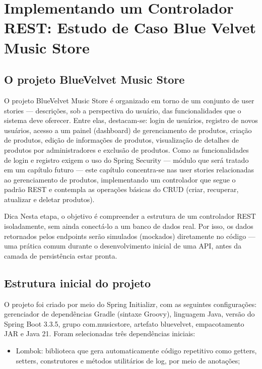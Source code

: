 \chapter{Implementando um Controlador REST: Estudo de Caso Blue Velvet Music Store}

\section{O projeto BlueVelvet Music Store}

O projeto BlueVelvet Music Store é organizado em torno de um conjunto de user stories — descrições, sob a perspectiva do usuário, das funcionalidades que o sistema deve oferecer. Entre elas, destacam-se: login de usuários, registro de novos usuários, acesso a um painel (dashboard) de gerenciamento de produtos, criação de produtos, edição de informações de produtos, visualização de detalhes de produtos por administradores e exclusão de produtos. Como as funcionalidades de login e registro exigem o uso do Spring Security — módulo que será tratado em um capítulo futuro — este capítulo concentra-se nas user stories relacionadas ao gerenciamento de produtos, implementando um controlador que segue o padrão REST e contempla as operações básicas do CRUD (criar, recuperar, atualizar e deletar produtos).

\begin{infobox}{Dica}
Nesta etapa, o objetivo é compreender a estrutura de um controlador REST isoladamente, sem ainda conectá-lo a um banco de dados real. Por isso, os dados retornados pelos endpoints serão simulados (mockados) diretamente no código — uma prática comum durante o desenvolvimento inicial de uma API, antes da camada de persistência estar pronta.
\end{infobox}

\section{Estrutura inicial do projeto}

O projeto foi criado por meio do Spring Initializr, com as seguintes configurações: gerenciador de dependências Gradle (sintaxe Groovy), linguagem Java, versão do Spring Boot 3.3.5, grupo com.musicstore, artefato bluevelvet, empacotamento JAR e Java 21. Foram selecionadas três dependências iniciais:

\begin{itemize}
  \item Lombok: biblioteca que gera automaticamente código repetitivo como getters, setters, construtores e métodos utilitários de log, por meio de anotações;
\end{itemize}

